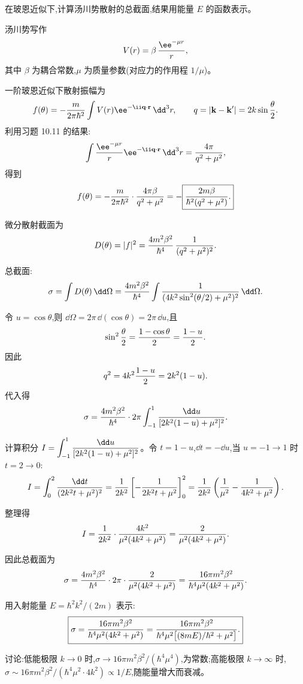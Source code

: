 \begin{question}
在玻恩近似下,计算汤川势散射的总截面,结果用能量 $E$ 的函数表示。
\end{question}
\begin{solution}
汤川势写作
\[
V(r)=\beta\,{\ee^{-\mu r}\over r},
\]
其中 $\beta$ 为耦合常数,$\mu$ 为质量参数(对应力的作用程 $1/\mu$)。

一阶玻恩近似下散射振幅为
\[
f(\theta)=-{m\over2\pi\hbar^2}\int V(r)\ee^{-\ii\mathbf q\cdot\mathbf r}\,\dd^3r,
\qquad q=|\mathbf k-\mathbf k'|=2k\sin{\theta\over2}.
\]
利用习题 10.11 的结果:
\[
\int {\ee^{-\mu r}\over r}\ee^{-\ii\mathbf q\cdot\mathbf r}\,\dd^3r={4\pi\over q^2+\mu^2},
\]
得到
\[
f(\theta)=-{m\over2\pi\hbar^2}\cdot{4\pi\beta\over q^2+\mu^2}
=-\boxed{{2m\beta\over\hbar^2(q^2+\mu^2)}.}
\]

微分散射截面为
\[
D(\theta)=|f|^2={4m^2\beta^2\over\hbar^4}\,{1\over(q^2+\mu^2)^2}.
\]

总截面:
\[
\sigma=\int D(\theta)\,\dd\Omega
={4m^2\beta^2\over\hbar^4}\int{1\over(4k^2\sin^2(\theta/2)+\mu^2)^2}\,\dd\Omega.
\]

令 $u=\cos\theta$,则 $\dd\Omega=2\pi\,\dd(\cos\theta)=2\pi\,\dd u$,且
\[
\sin^2{\theta\over2}={1-\cos\theta\over2}={1-u\over2}.
\]
因此
\[
q^2=4k^2{1-u\over2}=2k^2(1-u).
\]
代入得
\[
\sigma={4m^2\beta^2\over\hbar^4}\cdot2\pi\int_{-1}^{1}{\dd u\over[2k^2(1-u)+\mu^2]^2}.
\]

计算积分 $\displaystyle I=\int_{-1}^{1}{\dd u\over[2k^2(1-u)+\mu^2]^2}$。令 $t=1-u$,$\dd t=-\dd u$,当 $u=-1\to1$ 时 $t=2\to0$:
\[
I=\int_{0}^{2}{\dd t\over(2k^2t+\mu^2)^2}
={1\over2k^2}\left[-{1\over2k^2t+\mu^2}\right]_{0}^{2}
={1\over2k^2}\left({1\over\mu^2}-{1\over4k^2+\mu^2}\right).
\]

整理得
\[
I={1\over2k^2}\cdot{4k^2\over\mu^2(4k^2+\mu^2)}
={2\over\mu^2(4k^2+\mu^2)}.
\]

因此总截面为
\[
\sigma={4m^2\beta^2\over\hbar^4}\cdot2\pi\cdot{2\over\mu^2(4k^2+\mu^2)}
={16\pi m^2\beta^2\over\hbar^4\mu^2(4k^2+\mu^2)}.
\]

用入射能量 $E=\hbar^2k^2/(2m)$ 表示:
\[
\boxed{\sigma={16\pi m^2\beta^2\over\hbar^4\mu^2(4k^2+\mu^2)}
={16\pi m^2\beta^2\over\hbar^4\mu^2\bigl[(8mE)/\hbar^2+\mu^2\bigr]}.}
\]

讨论:低能极限 $k\to0$ 时,$\sigma\to 16\pi m^2\beta^2/(\hbar^4\mu^4)$,为常数;高能极限 $k\to\infty$ 时,$\sigma\sim16\pi m^2\beta^2/(\hbar^4\mu^2\cdot4k^2)\propto 1/E$,随能量增大而衰减。
\end{solution}


